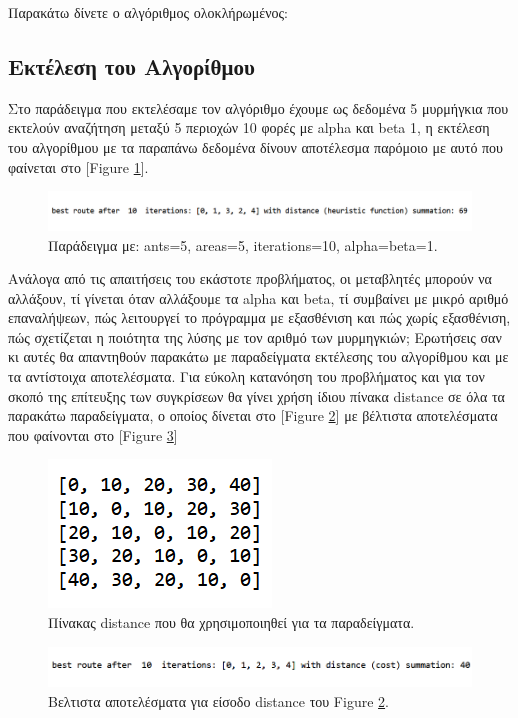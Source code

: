 Παρακάτω δίνετε ο αλγόριθμος ολοκλήρωμένος:




\subsection{Εκτέλεση του Αλγορίθμου}
Στο παράδειγμα που εκτελέσαμε τον αλγόριθμο έχουμε ως δεδομένα 5 μυρμήγκια που εκτελούν αναζήτηση μεταξύ 5 περιοχών 10 φορές με alpha και beta 1, η εκτέλεση του αλγορίθμου με τα παραπάνω δεδομένα δίνουν αποτέλεσμα παρόμοιο με αυτό που φαίνεται στο [Figure \ref{12}].

\begin{figure}
    \centering
    \includegraphics[scale=0.55]{2947_thesis/pictures/ex1.png} 
    \caption{Παράδειγμα με: ants=5, areas=5, iterations=10, alpha=beta=1.}
    \label{12}
\end{figure}

Ανάλογα από τις απαιτήσεις του εκάστοτε προβλήματος, οι μεταβλητές μπορούν να αλλάξουν, τί γίνεται όταν αλλάξουμε τα alpha και beta, τί συμβαίνει με μικρό αριθμό επαναλήψεων, πώς λειτουργεί το πρόγραμμα με εξασθένιση και πώς χωρίς εξασθένιση, πώς σχετίζεται η ποιότητα της λύσης με τον αριθμό των μυρμηγκιών; Ερωτήσεις σαν κι αυτές θα απαντηθούν παρακάτω με παραδείγματα εκτέλεσης του αλγορίθμου και με τα αντίστοιχα αποτελέσματα. 
Για εύκολη κατανόηση του προβλήματος και για τον σκοπό της επίτευξης των συγκρίσεων θα γίνει χρήση ίδιου πίνακα distance σε όλα τα παρακάτω παραδείγματα, ο οποίος δίνεται στο [Figure \ref{13}] με βέλτιστα αποτελέσματα που φαίνονται στο [Figure \ref{14}]
\begin{figure}
    \centering
    \includegraphics[scale=1]{2947_thesis/pictures/distance.png} 
    \caption{Πίνακας distance που θα χρησιμοποιηθεί για τα παραδείγματα.}
    \label{13}
\end{figure}
\begin{figure}
    \centering
    \includegraphics[scale=0.55]{2947_thesis/pictures/ex2.png} 
    \caption{Βελτιστα αποτελέσματα για είσοδο distance του Figure \ref{13}.}
    \label{14}
\end{figure}

